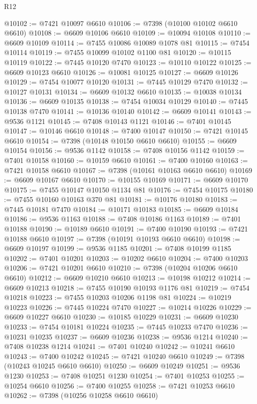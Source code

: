 \begin{lexlean}{R12}
\begin{coremodule}
{{{{{{{{{{{{{{{{{{{{{{{{{{{{{{{{{{{{{{{{{{{{{{{{{{{{{{{{{{{{{{{{{{{{{{{{{{{{{{{{{{@10102 := @7421 @10097 @6610
@10106 := @7398 (@10100 @10102 @6610 @6610)
@10108 := @6609 @10106 @6610
@10109 := @10094 @10108
@10110 := @6609 @10109
@10114 := @7455 @10086 @10089 @1078 @81
@10115 := @7454 @10114
@10119 := @7455 @10099 @10102 @1100 @81
@10120 := @10115 @10119
@10122 := @7445 @10120 @7470
@10123 := @10110 @10122
@10125 := @6609 @10123 @6610
@10126 := @10081 @10125
@10127 := @6609 @10126
@10129 := @7454 @10077 @10120
@10131 := @7445 @10129 @7470
@10132 := @10127 @10131
@10134 := @6609 @10132 @6610
@10135 := @10038 @10134
@10136 := @6609 @10135
@10138 := @7454 @10034 @10129
@10140 := @7445 @10138 @7470
@10141 := @10136 @10140
@10142 := @6609 @10141
@10143 := @9536 @1121
@10145 := @7408 @10143 @1121
@10146 := @7401 @10145
@10147 := @10146 @6610
@10148 := @7400 @10147
@10150 := @7421 @10145 @6610
@10154 := @7398 (@10148 @10150 @6610 @6610)
@10155 := @6609 @10154
@10156 := @9536 @1142
@10158 := @7408 @10156 @1142
@10159 := @7401 @10158
@10160 := @10159 @6610
@10161 := @7400 @10160
@10163 := @7421 @10158 @6610
@10167 := @7398 (@10161 @10163 @6610 @6610)
@10169 := @6609 @10167 @6610
@10170 := @10155 @10169
@10171 := @6609 @10170
@10175 := @7455 @10147 @10150 @1134 @81
@10176 := @7454 @10175
@10180 := @7455 @10160 @10163 @370 @81
@10181 := @10176 @10180
@10183 := @7445 @10181 @7470
@10184 := @10171 @10183
@10185 := @6609 @10184
@10186 := @9536 @1163
@10188 := @7408 @10186 @1163
@10189 := @7401 @10188
@10190 := @10189 @6610
@10191 := @7400 @10190
@10193 := @7421 @10188 @6610
@10197 := @7398 (@10191 @10193 @6610 @6610)
@10198 := @6609 @10197
@10199 := @9536 @1185
@10201 := @7408 @10199 @1185
@10202 := @7401 @10201
@10203 := @10202 @6610
@10204 := @7400 @10203
@10206 := @7421 @10201 @6610
@10210 := @7398 (@10204 @10206 @6610 @6610)
@10212 := @6609 @10210 @6610
@10213 := @10198 @10212
@10214 := @6609 @10213
@10218 := @7455 @10190 @10193 @1176 @81
@10219 := @7454 @10218
@10223 := @7455 @10203 @10206 @1198 @81
@10224 := @10219 @10223
@10226 := @7445 @10224 @7470
@10227 := @10214 @10226
@10229 := @6609 @10227 @6610
@10230 := @10185 @10229
@10231 := @6609 @10230
@10233 := @7454 @10181 @10224
@10235 := @7445 @10233 @7470
@10236 := @10231 @10235
@10237 := @6609 @10236
@10238 := @9536 @1214
@10240 := @7408 @10238 @1214
@10241 := @7401 @10240
@10242 := @10241 @6610
@10243 := @7400 @10242
@10245 := @7421 @10240 @6610
@10249 := @7398 (@10243 @10245 @6610 @6610)
@10250 := @6609 @10249
@10251 := @9536 @1230
@10253 := @7408 @10251 @1230
@10254 := @7401 @10253
@10255 := @10254 @6610
@10256 := @7400 @10255
@10258 := @7421 @10253 @6610
@10262 := @7398 (@10256 @10258 @6610 @6610)
}}}}}}}}}}}}}}}}}}}}}}}}}}}}}}}}}}}}}}}}}}}}}}}}}}}}}}}}}}}}}}}}}}}}}}}}}}}}}}}}}}
\end{coremodule}
\end{lexlean}
